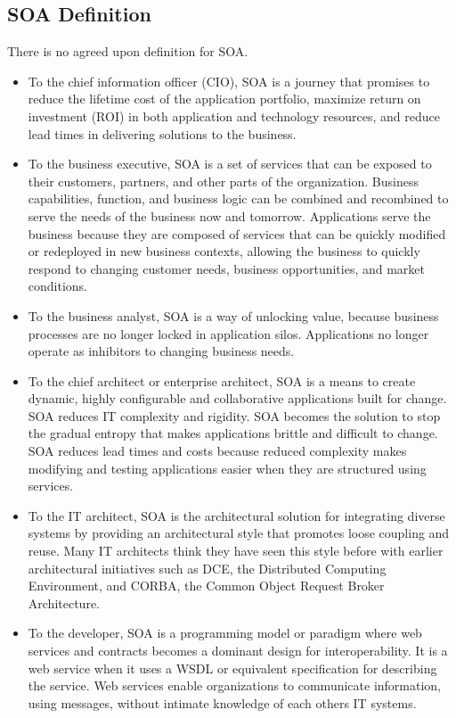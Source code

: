 \documentclass[12pt,a4paper,final,twoside,onecolumn,titlepage]{book}
\begin{document}
\subsection{SOA Definition}
\label{SOADefinition}
There is no agreed upon definition for \gls{SOA}.
\begin{itemize}
\item To the chief information officer (CIO), \gls{SOA} is a journey that promises to reduce the lifetime cost of the application portfolio, maximize return on investment (ROI) in both application and technology resources, and reduce lead times in delivering solutions to the business.
\item To the business executive, \gls{SOA} is a set of services that can be exposed to their customers, partners, and other parts of the organization. Business capabilities, function, and business logic can be combined and recombined to serve the needs of the business now and tomorrow. Applications serve the business because they are composed of services that can be quickly modified or redeployed in new business contexts, allowing the business to quickly respond to changing customer needs, business opportunities, and market conditions.
\item To the business analyst, \gls{SOA} is a way of unlocking value, because business processes are no longer locked in application silos. Applications no longer operate as inhibitors to changing business needs.
\item To the chief architect or enterprise architect, \gls{SOA} is a means to create dynamic, highly configurable and collaborative applications built for change. \gls{SOA} reduces IT complexity and rigidity. \gls{SOA} becomes the solution to stop the gradual entropy that makes applications brittle and difficult to change. \gls{SOA} reduces lead times and costs because reduced complexity makes modifying and testing applications easier when they are structured using services.
\item To the IT architect, \gls{SOA} is the architectural solution for integrating diverse systems by providing an architectural style that promotes loose coupling and reuse. Many IT architects think they have seen this style before with earlier architectural initiatives such as \gls{DCE}, the Distributed Computing Environment, and \gls{CORBA}, the Common Object Request Broker Architecture.
\item To the developer, \gls{SOA} is a programming model or paradigm where web services and contracts becomes a dominant design for interoperability. It is a web service when it uses a \gls{WSDL} or equivalent specification for describing the service. Web services enable organizations to communicate information, using messages, without intimate knowledge of each others IT systems.
\end{itemize}
\end{document}
